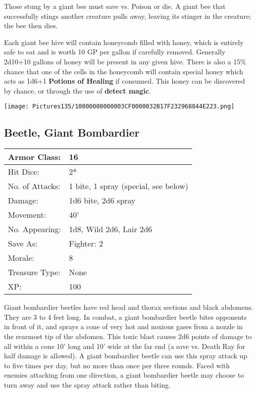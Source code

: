 \documentclass[a4paper,twoside,openany,10pt]{book}
\begin{document}
\begin{multicols}{2}
Those stung by a giant bee must save vs. Poison or die. A giant bee that successfully stings another creature pulls away, leaving its stinger in the creature; the bee then dies.

Each giant bee hive will contain honeycomb filled with honey, which is entirely safe to eat and is worth 10 GP per gallon if carefully removed. Generally 2d10+10 gallons of honey will be present in any given hive. There is also a 15\% chance that one of the cells in the honeycomb will contain special honey which acts as 1d6+1 \textbf{Potions of Healing} if consumed. This honey can be discovered by chance, or through the use of \textbf{detect magic}.

\begin{center}
	\texttt{[image: Pictures135/10000000000003CF0000032B17F232968844E223.png]}
\end{center}

\subsection*{Beetle, Giant Bombardier}\label{beetle-giant-bombardier}

\begin{tabularx}{0.48\textwidth}{@{}lX@{}}
Armor Class: & 16 \\\hline
Hit Dice: & 2* \\\hline
No. of Attacks: & 1 bite, 1 spray (special, see below) \\\hline
Damage: & 1d6 bite, 2d6 spray \\\hline
Movement: & 40' \\\hline
No. Appearing: & 1d8, Wild 2d6, Lair 2d6 \\\hline
Save As: & Fighter: 2 \\\hline
Morale: & 8 \\\hline
Treasure Type: & None \\\hline
XP: & 100 \\\hline
\end{tabularx}\medskip

Giant bombardier beetles have red head and thorax sections and black abdomens. They are 3 to 4 feet long. In combat, a giant bombardier beetle bites opponents in front of it, and sprays a cone of very hot and noxious gases from a nozzle in the rearmost tip of the abdomen. This toxic blast causes 2d6 points of damage to all within a cone 10' long and 10' wide at the far end (a save vs. Death Ray for half damage is allowed). A giant bombardier beetle can use this spray attack up to five times per day, but no more than once per three rounds. Faced with enemies attacking from one direction, a giant bombardier beetle may choose to turn away and use the spray attack rather than biting. 


\end{multicols}
\end{document}
